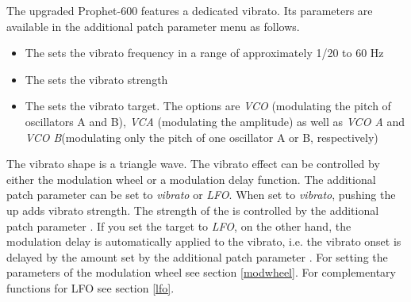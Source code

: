 The upgraded Prophet-600 features a dedicated vibrato. Its parameters are available in the additional patch parameter menu as follows.

\begin{itemize}
  \item The \vibspeed sets the vibrato frequency in a range of approximately 1/20 to 60 Hz
  \item The \vibamt sets the vibrato strength
  \item The \vibtgt sets the vibrato target. The options are \textit{VCO} (modulating the pitch of oscillators A  and B), \textit{VCA} (modulating the amplitude) as well as \textit{VCO A} and \textit{VCO B}(modulating only the pitch of one oscillator A  or  B, respectively)
\end{itemize}

The vibrato shape is a triangle wave. The vibrato effect can be controlled by either the modulation wheel or a modulation delay function. The additional patch parameter \modwheeltarget can be set to \textit{vibrato} or \textit{LFO}. When set to \textit{vibrato}, pushing the \modwheel up adds vibrato strength. The strength of the \modwheel is controlled by the additional patch parameter \modwheelrange. If you set the \modwheel target to \textit{LFO}, on the other hand, the modulation delay is automatically applied to the vibrato, i.e. the vibrato onset is delayed by the amount set by the additional patch parameter \moddelay. For setting the parameters of the modulation wheel see section \ref{modwheel}. For complementary functions for LFO see section \ref{lfo}.
